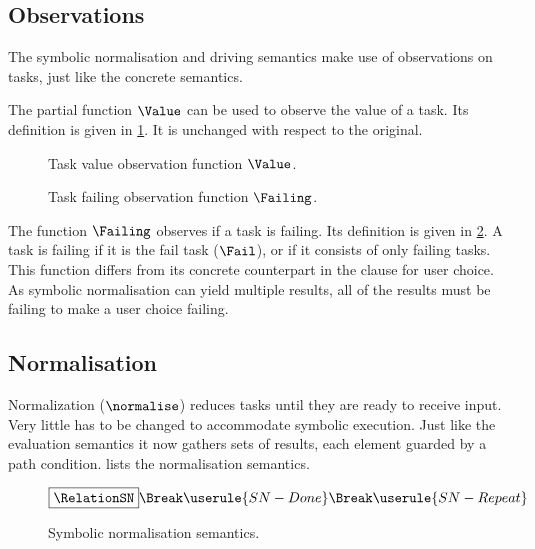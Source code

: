 \subsection{Observations}
\label{subsec:observations}

The symbolic normalisation and driving semantics make use of observations on tasks, just like the concrete semantics.

The partial function $\Value$ can be used to observe the value of a task.
Its definition is given in \cref{fig:value}.
It is unchanged with respect to the original.

\begin{figure}[ht]
  \small
  \begin{center}
  \end{center}
  \caption{Task value observation function $\Value$.}
  \label{fig:value}
\end{figure}

\begin{figure}[ht]
  \small
  \begin{center}
  \end{center}
  \caption{Task failing observation function $\Failing$.}
  \label{fig:failing}
\end{figure}

The function $\Failing$ observes if a task is failing.
Its definition is given in \cref{fig:failing}.
A task is failing if it is the fail task ($\Fail$), or if it consists of only failing tasks.
This function differs from its concrete counterpart in the clause for user choice.
As symbolic normalisation can yield multiple results, all of the results must be failing to make a user choice failing.



\subsection{Normalisation}

Normalization ($\normalise$) reduces tasks until they are ready to receive input.
Very little has to be changed to accommodate symbolic execution.
Just like the evaluation semantics it now gathers sets of results, each element guarded by a path condition.
 lists the normalisation semantics.

\begin{figure}[ht]
    \small
    \begin{gather*}
      \boxed{\RelationSN} \Break
      \userule{SN-Done} \Break
      \userule{SN-Repeat}
    \end{gather*}
  \caption{Symbolic normalisation semantics.}
  \label{fig:normalising}
\end{figure}

